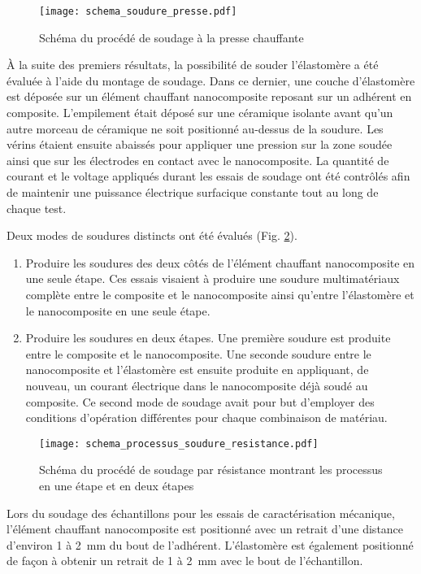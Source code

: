 \begin{figure}[h]
	\centering
	\texttt{[image: schema\_soudure\_presse.pdf]}
	\caption{Schéma du procédé de soudage à la presse chauffante}
	\label{fig:schema_soudure_presse}
\end{figure}

À la suite des premiers résultats, la possibilité de souder l'élastomère a été évaluée à l'aide du montage de soudage. 
Dans ce dernier, une couche d'élastomère est déposée sur un élément chauffant nanocomposite reposant sur un adhérent en composite. 
L'empilement était déposé sur une céramique isolante avant qu'un autre morceau de céramique ne soit positionné au-dessus de la soudure. 
Les vérins étaient ensuite abaissés pour appliquer une pression sur la zone soudée ainsi que sur les électrodes en contact avec le nanocomposite. 
La quantité de courant et le voltage appliqués durant les essais de soudage ont été contrôlés afin de maintenir une puissance électrique surfacique constante tout au long de chaque test. 

Deux modes de soudures distincts ont été évalués (Fig. \ref{fig:schema_processus_soudure_resistance}). 
\begin{enumerate}
	\item Produire les soudures des deux côtés de l'élément chauffant nanocomposite en une seule étape. 
	Ces essais visaient à produire une soudure multimatériaux complète entre le composite et le nanocomposite ainsi qu'entre l'élastomère et le nanocomposite en une seule étape. 
	\item Produire les soudures en deux étapes. 
	Une première soudure est produite entre le composite et le nanocomposite. 
	Une seconde soudure entre le nanocomposite et l'élastomère est ensuite produite en appliquant, de nouveau, un courant électrique dans le nanocomposite déjà soudé au composite. 
	Ce second mode de soudage avait pour but d'employer des conditions d'opération différentes pour chaque combinaison de matériau. 
\end{enumerate}

\begin{figure}[h]
	\centering
	\texttt{[image: schema\_processus\_soudure\_resistance.pdf]}
	\caption{Schéma du procédé de soudage par résistance montrant les processus en une étape et en deux étapes}
	\label{fig:schema_processus_soudure_resistance}
\end{figure}
\FloatBarrier

Lors du soudage des échantillons pour les essais de caractérisation mécanique, l'élément chauffant nanocomposite est positionné avec un retrait d'une distance d'environ 1 à \SI[locale=FR]{2}{\milli\metre} du bout de l'adhérent. 
L'élastomère est également positionné de façon à obtenir un retrait de 1 à \SI[locale=FR]{2}{\milli\metre} avec le bout de l'échantillon. 

